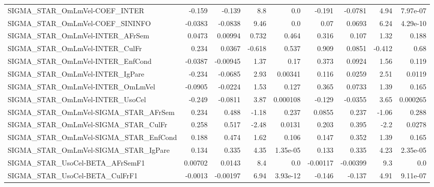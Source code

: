 \begin{tabular}{lrrrrrrrr}
SIGMA\_STAR\_OmLmVel-COEF\_INTER         &      -0.159 &       -0.139 &     8.8 &      0.0 &     -0.191 &     -0.0781 &         4.94 &      7.97e-07 \\
SIGMA\_STAR\_OmLmVel-COEF\_SININFO       &     -0.0383 &      -0.0838 &    9.46 &      0.0 &       0.07 &      0.0693 &         6.24 &      4.29e-10 \\
SIGMA\_STAR\_OmLmVel-INTER\_AFrSem       &      0.0473 &      0.00994 &   0.732 &    0.464 &      0.316 &       0.107 &         1.32 &         0.188 \\
SIGMA\_STAR\_OmLmVel-INTER\_CulFr        &       0.234 &       0.0367 &  -0.618 &    0.537 &      0.909 &      0.0851 &       -0.412 &          0.68 \\
SIGMA\_STAR\_OmLmVel-INTER\_EnfCond      &     -0.0387 &     -0.00945 &    1.37 &     0.17 &      0.373 &      0.0924 &         1.56 &         0.119 \\
SIGMA\_STAR\_OmLmVel-INTER\_IgPare       &      -0.234 &      -0.0685 &    2.93 &  0.00341 &      0.116 &      0.0259 &         2.51 &        0.0119 \\
SIGMA\_STAR\_OmLmVel-INTER\_OmLmVel      &     -0.0905 &      -0.0224 &    1.53 &    0.127 &      0.365 &      0.0733 &         1.39 &         0.165 \\
SIGMA\_STAR\_OmLmVel-INTER\_UsoCel       &      -0.249 &      -0.0811 &    3.87 & 0.000108 &     -0.129 &     -0.0355 &         3.65 &      0.000265 \\
SIGMA\_STAR\_OmLmVel-SIGMA\_STAR\_AFrSem  &       0.234 &        0.488 &   -1.18 &    0.237 &     0.0855 &       0.237 &        -1.06 &         0.288 \\
SIGMA\_STAR\_OmLmVel-SIGMA\_STAR\_CulFr   &       0.258 &        0.517 &   -2.48 &   0.0131 &      0.203 &       0.395 &         -2.2 &        0.0278 \\
SIGMA\_STAR\_OmLmVel-SIGMA\_STAR\_EnfCond &       0.188 &        0.474 &    1.62 &    0.106 &      0.147 &       0.352 &         1.39 &         0.165 \\
SIGMA\_STAR\_OmLmVel-SIGMA\_STAR\_IgPare  &       0.134 &        0.335 &    4.35 & 1.35e-05 &      0.133 &       0.335 &         4.23 &      2.35e-05 \\
SIGMA\_STAR\_UsoCel-BETA\_AFrSemF1       &     0.00702 &       0.0143 &     8.4 &      0.0 &   -0.00117 &    -0.00399 &          9.3 &           0.0 \\
SIGMA\_STAR\_UsoCel-BETA\_CulFrF1        &     -0.0013 &     -0.00197 &    6.94 & 3.93e-12 &     -0.146 &      -0.137 &         4.91 &      9.11e-07 \\

\end{tabular}
